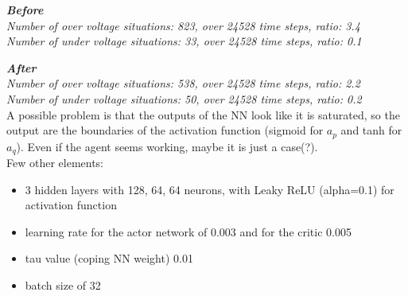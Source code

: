 \emph{
\textbf{Before}\\
Number of over voltage situations: 823, over 24528 time steps, ratio: 3.4\\
Number of under voltage situations: 33, over 24528 time steps, ratio: 0.1\\}

\emph{
\textbf{After}\\
Number of over voltage situations: 538, over 24528 time steps, ratio: 2.2\\
Number of under voltage situations: 50, over 24528 time steps, ratio: 0.2}\\

A possible problem is that the outputs of the NN look like it is saturated, so the output are the boundaries of the activation function (sigmoid for $a_p$ and tanh for $a_q$). Even if the agent seems working, maybe it is just a case(?).\\

Few other elements:\\
\begin{itemize}
\item 3 hidden layers with 128, 64, 64 neurons, with Leaky ReLU (alpha=0.1) for activation function 
\item learning rate for the actor network of 0.003 and for the critic 0.005
\item tau value (coping NN weight) 0.01
\item batch size of 32
\end{itemize}




